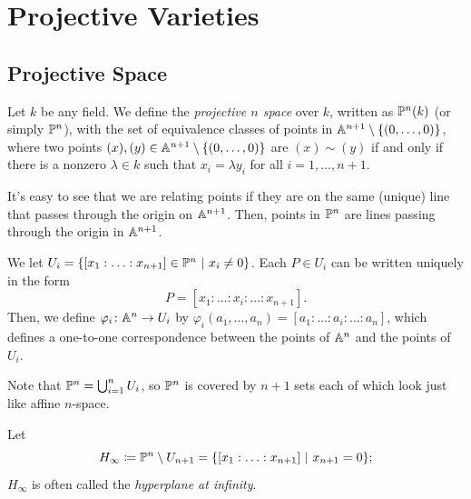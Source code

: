 \chapter{Projective Varieties}

\section{Projective Space}

\begin{definition}
	Let $k$ be any field. We define the \textit{projective $n$ space} over $k$, written as $\mathbb{P}^{n}(k)$ (or simply $\mathbb{P}^{n}$), with the set of equivalence classes of points in $\mathbb{A}^{n+1} \setminus \{(0,\dots,0)\}$, where two points $(x),(y) \in \mathbb{A}^{n+1} \setminus \{(0,\dots,0)\}$ are $(x) \sim (y)$ if and only if there is a nonzero $\lambda \in k$ such that $x_{i} = \lambda y_{i}$ for all $i = 1,\dots,n+1$. 
\end{definition}

\begin{remark}
	It's easy to see that we are relating points if they are on the same (unique) line that passes through the origin on $\mathbb{A}^{n+1}$. Then, points in $\mathbb{P}^{n}$ are lines passing through the origin in $\mathbb{A}^{n+1}$.
\end{remark}

\begin{definition}
	We let $U_{i} = \{[x_{1} : \ldots : x_{n+1}] \in \mathbb{P}^{n} \ | \ x_{i} \neq 0\}$. Each $P \in U_{i}$ can be written uniquely in the form
	\[ P = [ x_{1} : \ldots : x_{i} : \ldots : x_{n+1} ]. \]
	Then, we define $\varphi_{i} \colon \mathbb{A}^{n} \to U_{i}$ by $\varphi_{i}(a_{1},\ldots,a_{n}) = [a_{1} : \ldots : a_{i} : \ldots : a_{n}]$, which defines a one-to-one correspondence between the points of $\mathbb{A}^{n}$ and the points of $U_{i}$.
\end{definition}

\begin{remark}
	Note that $\mathbb{P}^{n} = \bigcup_{i=1}^{n} U_{i}$, so $\mathbb{P}^{n}$ is covered by $n+1$ sets each of which look just like affine $n$-space.
\end{remark}

\begin{definition}
	Let
	\[ H_{\infty} \coloneq \mathbb{P}^{n} \setminus U_{n+1} = \{[x_{1} : \ldots : x_{n+1}] \ | \ x_{n+1} = 0\}; \]
	$H_{\infty}$ is often called the \textit{hyperplane at infinity}.
\end{definition}


